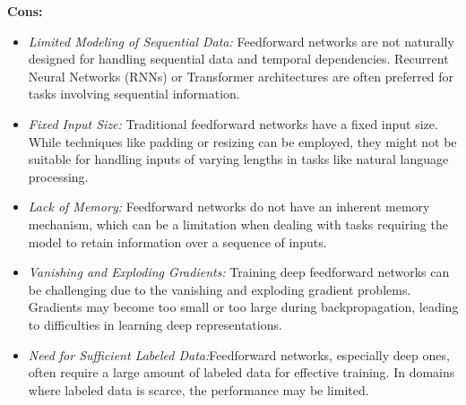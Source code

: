 \textbf{Cons:}
\begin{itemize}
    \item \textit{Limited Modeling of Sequential Data:} Feedforward networks are not naturally designed for handling sequential data and temporal dependencies. Recurrent Neural Networks (RNNs) or Transformer architectures are often preferred for tasks involving sequential information.
    \item \textit{Fixed Input Size:} Traditional feedforward networks have a fixed input size. While techniques like padding or resizing can be employed, they might not be suitable for handling inputs of varying lengths in tasks like natural language processing.
    \item \textit{Lack of Memory:} Feedforward networks do not have an inherent memory mechanism, which can be a limitation when dealing with tasks requiring the model to retain information over a sequence of inputs.
    \item \textit{Vanishing and Exploding Gradients:} Training deep feedforward networks can be challenging due to the vanishing and exploding gradient problems. Gradients may become too small or too large during backpropagation, leading to difficulties in learning deep representations.
    \item \textit{Need for Sufficient Labeled Data:}Feedforward networks, especially deep ones, often require a large amount of labeled data for effective training. In domains where labeled data is scarce, the performance may be limited.
\end{itemize}

